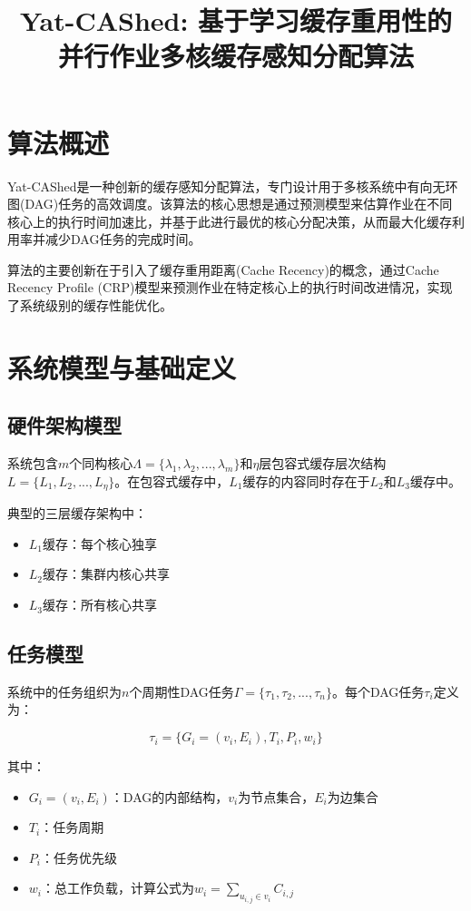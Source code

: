 \documentclass[12pt]{article}
\title{Yat-CAShed: 基于学习缓存重用性的并行作业多核缓存感知分配算法}
\author{}
\date{}
\begin{document}
\maketitle

\section{算法概述}

Yat-CAShed是一种创新的缓存感知分配算法，专门设计用于多核系统中有向无环图(DAG)任务的高效调度。该算法的核心思想是通过预测模型来估算作业在不同核心上的执行时间加速比，并基于此进行最优的核心分配决策，从而最大化缓存利用率并减少DAG任务的完成时间。

算法的主要创新在于引入了缓存重用距离(Cache Recency)的概念，通过Cache Recency Profile (CRP)模型来预测作业在特定核心上的执行时间改进情况，实现了系统级别的缓存性能优化。

\section{系统模型与基础定义}

\subsection{硬件架构模型}

系统包含$m$个同构核心$\Lambda = \{\lambda_1, \lambda_2, ..., \lambda_m\}$和$\eta$层包容式缓存层次结构$L = \{L_1, L_2, ..., L_\eta\}$。在包容式缓存中，$L_1$缓存的内容同时存在于$L_2$和$L_3$缓存中。

典型的三层缓存架构中：
\begin{itemize}
    \item $L_1$缓存：每个核心独享
    \item $L_2$缓存：集群内核心共享
    \item $L_3$缓存：所有核心共享
\end{itemize}

\subsection{任务模型}

系统中的任务组织为$n$个周期性DAG任务$\Gamma = \{\tau_1, \tau_2, ..., \tau_n\}$。每个DAG任务$\tau_i$定义为：

$$\tau_i = \{G_i = (v_i, E_i), T_i, P_i, w_i\}$$

其中：
\begin{itemize}
    \item $G_i = (v_i, E_i)$：DAG的内部结构，$v_i$为节点集合，$E_i$为边集合
    \item $T_i$：任务周期
    \item $P_i$：任务优先级
    \item $w_i$：总工作负载，计算公式为$w_i = \sum_{u_{i,j} \in v_i} C_{i,j}$
\end{itemize}
\end{document}

